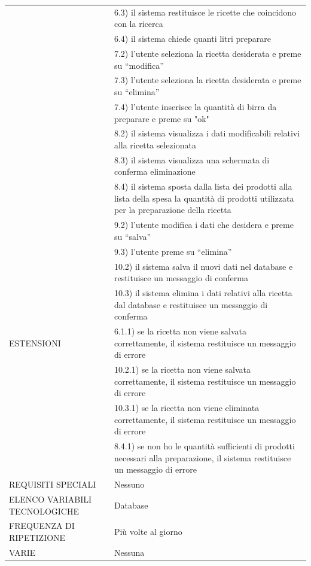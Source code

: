 \documentclass[a4paper, titlepage]{article}
\begin{document}
\begin{longtable}{p{6cm}p{7cm}}
    & 6.3) il sistema restituisce le ricette che coincidono con la ricerca\\
    & 6.4) il sistema chiede quanti litri preparare\\
    & 7.2) l’utente seleziona la ricetta desiderata e preme su “modifica”\\
    & 7.3) l’utente seleziona la ricetta desiderata e preme su “elimina”\\
    & 7.4) l'utente inserisce la quantità di birra da preparare e preme su "ok"\\
    & 8.2) il sistema visualizza i dati modificabili relativi alla ricetta selezionata\\
    & 8.3) il sistema visualizza una schermata di conferma eliminazione\\
    & 8.4) il sistema sposta dalla lista dei prodotti alla lista della spesa la quantità di prodotti utilizzata per la preparazione della ricetta\\
    & 9.2) l’utente modifica i dati che desidera e preme su “salva”\\
    & 9.3) l’utente preme su “elimina”\\
    & 10.2) il sistema salva il nuovi dati nel database e restituisce un messaggio di conferma\\
    & 10.3) il sistema elimina i dati relativi alla ricetta dal database e restituisce un messaggio di conferma\\\midrule
    ESTENSIONI
    & 6.1.1) se la ricetta non viene salvata correttamente, il sistema restituisce un messaggio di errore\\
    & 10.2.1) se la ricetta non viene salvata correttamente, il sistema restituisce un messaggio di errore\\
    & 10.3.1) se la ricetta non viene eliminata correttamente, il sistema restituisce un messaggio di errore\\
    & 8.4.1) se non ho le quantità sufficienti di prodotti necessari alla preparazione, il sistema restituisce un messaggio di errore\\\midrule
    REQUISITI SPECIALI & Nessuno\\\midrule
    ELENCO VARIABILI TECNOLOGICHE & Database\\\midrule
    FREQUENZA DI RIPETIZIONE & Più volte al giorno\\\midrule
    VARIE & Nessuna\\\bottomrule
\end{longtable}
\vphantom{}
\end{document}
